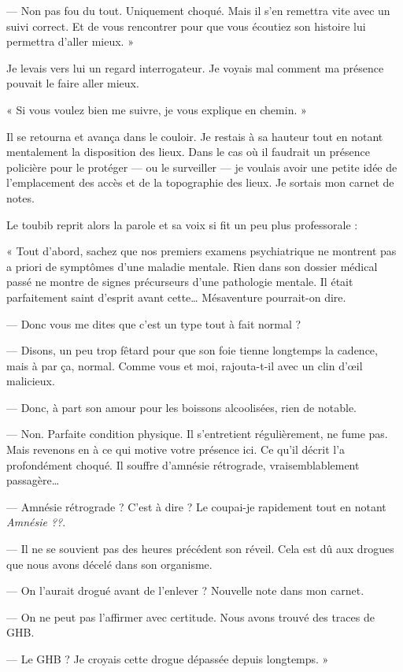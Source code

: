 — Non pas fou du tout. Uniquement choqué. Mais il s'en remettra vite avec un suivi correct. Et de vous rencontrer pour
que vous écoutiez son histoire lui permettra d'aller mieux. »

Je levais vers lui un regard interrogateur. Je voyais mal comment ma présence pouvait le faire aller mieux.

« Si vous voulez bien me suivre, je vous explique en chemin. »

Il se retourna et avança dans le couloir. Je restais à sa hauteur tout en notant mentalement la disposition des lieux.
Dans le cas où il faudrait un présence policière pour le protéger — ou le surveiller — je voulais avoir une petite idée
de l'emplacement des accès et de la topographie des lieux. Je sortais mon carnet de notes.

Le toubib reprit alors la parole et sa voix si fit un peu plus professorale :

« Tout d'abord, sachez que nos premiers examens psychiatrique ne montrent pas a priori de symptômes d'une maladie
mentale. Rien dans son dossier médical passé ne montre de signes précurseurs d'une pathologie mentale. Il était 
parfaitement saint d'esprit avant cette… Mésaventure pourrait-on dire.

— Donc vous me dites que c'est un type tout à fait normal ?

— Disons, un peu trop fêtard pour que son foie tienne longtemps la cadence, mais à par ça, normal. Comme vous et moi,
rajouta-t-il avec un clin d'œil malicieux.

— Donc, à part son amour pour les boissons alcoolisées, rien de notable.

— Non. Parfaite condition physique. Il s'entretient régulièrement, ne fume pas. Mais revenons en à ce qui motive votre
présence ici. Ce qu'il décrit l'a profondément choqué. Il souffre d'amnésie rétrograde, vraisemblablement passagère…

— Amnésie rétrograde ? C'est à dire ? Le coupai-je rapidement tout en notant \emph{Amnésie ??}.

— Il ne se souvient pas des heures précédent son réveil. Cela est dû aux drogues que nous avons décelé dans son
organisme.

— On l'aurait drogué avant de l'enlever ? Nouvelle note dans mon carnet.

— On ne peut pas l'affirmer avec certitude. Nous avons trouvé des traces de GHB.

— Le GHB ? Je croyais cette drogue dépassée depuis longtemps. »

